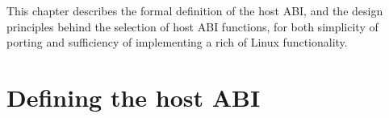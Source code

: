 




This chapter describes the formal definition of the \graphene{} host ABI, and 
the design principles behind the selection of host ABI functions, for both simplicity of porting and sufficiency of implementing a rich of Linux functionality.






\section{Defining the host ABI}


\begin{comment}
This chapter describes the formal definition of the host ABI, and discusses the rationale behind the definition, based on the design principles of \graphene{}.
The host ABI is a key component
to the \graphene{} design,
to simplify the OS development effort for achieving or restoring compatibility.
This chapter shows how to select the host ABI as a ``pinch point'' in a Linux-compatible OS, to virtualize OS components into the user space.
\end{comment}




